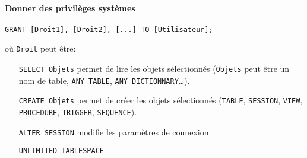 \documentclass[10pt,a4paper,french]{article}
\begin{document}
\paragraph{Donner des privilèges systèmes}
\begin{verbatim}
GRANT [Droit1], [Droit2], [...] TO [Utilisateur];
\end{verbatim}
où {\tt Droit} peut être:
\begin{itemize}
\item[\tt SELECT Objets] permet de lire les objets sélectionnés ({\tt Objets} peut être un nom de table, {\tt ANY TABLE}, {\tt ANY DICTIONNARY}\ldots).
\item[\tt CREATE Objets] permet de créer les objets sélectionnés ({\tt TABLE}, {\tt SESSION}, {\tt VIEW}, {\tt PROCEDURE}, {\tt TRIGGER}, {\tt SEQUENCE}).
\item[\tt ALTER SESSION] modifie les paramètres de connexion.
\item[\tt UNLIMITED TABLESPACE]
\end{itemize}

\appendix %

\printglossaries
\end{document}
